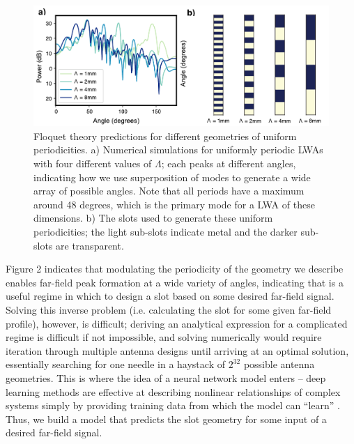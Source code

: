 \documentclass[11pt]{article}
\begin{document}
\begin{figure}[H]
	\centering
	\includegraphics[width=6in]{figures/theorypdfslots}
	\caption{Floquet theory predictions for different geometries of uniform periodicities. a) Numerical simulations for uniformly periodic LWAs with four different values of $\Lambda$; each peaks at different angles, indicating how we use superposition of modes to generate a wide array of possible angles. Note that all periods have a maximum around 48 degrees, which is the primary mode for a LWA of these dimensions. b) The slots used to generate these uniform periodicities; the light sub-slots indicate metal and the darker sub-slots are transparent.}
\end{figure}

\noindent Figure 2 indicates that modulating the periodicity of the geometry we describe enables far-field peak formation at a wide variety of angles, indicating that is a useful regime in which to design a slot based on some desired far-field signal. Solving this inverse problem (i.e. calculating the slot for some given far-field profile), however, is difficult; deriving an analytical expression for a complicated regime is difficult if not impossible, and solving numerically would require iteration through multiple antenna designs until arriving at an optimal solution, essentially searching for one needle in a haystack of $2^{32}$ possible antenna geometries. This is where the idea of a neural network model enters -- deep learning methods are effective at describing nonlinear relationships of complex systems simply by providing training data from which the model can ``learn'' \cite{raissi2018deep}. Thus, we build a model that predicts the slot geometry for some input of a desired far-field signal. \\
\end{document}
